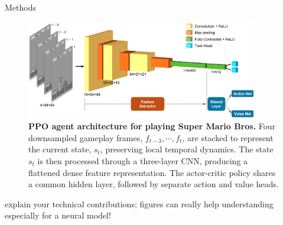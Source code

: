 \documentclass[final]{beamer}
\newlength{\colwidth}
\begin{document}
\begin{frame}[t]
\begin{columns}[t]
\begin{column}{\colwidth}
  \begin{block}{Methods}
      \begin{figure}[h]%
          \centering
          \includegraphics[width=0.9\textwidth]{pics/architecture.png}
          \caption{\textbf{PPO agent architecture for playing Super Mario Bros.}
            Four downsampled gameplay frames, ${f_{t-3}, \cdots, f_t}$, are stacked to represent the current state, $s_t$, preserving local temporal dynamics. The state $s_t$ is then processed through a three-layer CNN, producing a flattened dense feature representation. The actor-critic policy shares a common hidden layer, followed by separate action and value heads.
          }%
          \label{fig:example}%
      \end{figure}
    explain your technical contributions; figures can really help understanding especially for a neural model!


    

\end{block}
\end{column}
\end{columns}
\end{frame}
\end{document}
